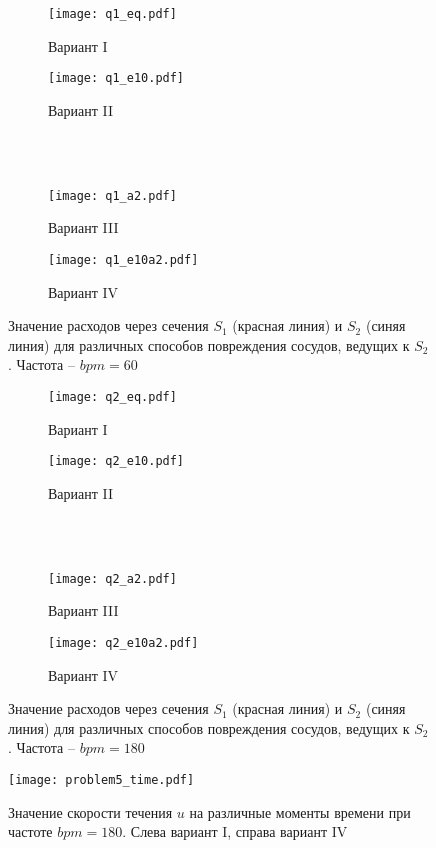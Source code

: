 \begin{figure}[h!]
\begin{subfigure}{0.5\linewidth}\centering
\texttt{[image: q1\_eq.pdf]}
\caption{Вариант I}\label{fig:prob5_q1_eq}
\end{subfigure}%
\begin{subfigure}{0.5\linewidth}\centering
\texttt{[image: q1\_e10.pdf]}
\caption{Вариант II}\label{fig:prob5_q1_e10}
\end{subfigure} \\
\hfill \\
\begin{subfigure}{0.5\linewidth}\centering
\texttt{[image: q1\_a2.pdf]}
\caption{Вариант III}\label{fig:prob5_q1_a2}
\end{subfigure}%
\begin{subfigure}{0.5\linewidth}\centering
\texttt{[image: q1\_e10a2.pdf]}
\caption{Вариант IV}\label{fig:prob5_a1_e10a2}
\end{subfigure}%
\caption{Значение расходов через сечения $S_1$ (красная линия) и $S_2$ (синяя линия) для различных способов повреждения сосудов, ведущих к $S_2$. Частота -- $bpm=60$}
\label{fig:prob5_q1}
\end{figure}

\begin{figure}[h!]
\begin{subfigure}{0.5\linewidth}\centering
\texttt{[image: q2\_eq.pdf]}
\caption{Вариант I}\label{fig:prob5_q2_eq}
\end{subfigure}%
\begin{subfigure}{0.5\linewidth}\centering
\texttt{[image: q2\_e10.pdf]}
\caption{Вариант II}\label{fig:prob5_q2_e10}
\end{subfigure} \\
\hfill \\
\begin{subfigure}{0.5\linewidth}\centering
\texttt{[image: q2\_a2.pdf]}
\caption{Вариант III}\label{fig:prob5_q2_a2}
\end{subfigure}%
\begin{subfigure}{0.5\linewidth}\centering
\texttt{[image: q2\_e10a2.pdf]}
\caption{Вариант IV}\label{fig:prob5_a2_e10a2}
\end{subfigure}%
\caption{Значение расходов через сечения $S_1$ (красная линия) и $S_2$ (синяя линия) для различных способов повреждения сосудов, ведущих к $S_2$. Частота -- $bpm=180$}
\label{fig:prob5_q2}
\end{figure}

\begin{figure}[h!]
\centering
\texttt{[image: problem5\_time.pdf]}
\caption{Значение скорости течения $u$ на различные моменты времени при частоте $bpm=180$. Слева вариант I, справа вариант IV}\label{fig:prob5_time}

\end{figure}
